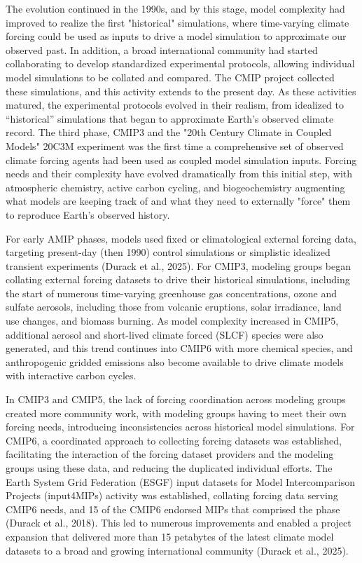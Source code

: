 \documentclass[gmd, preprint]{copernicus}
\begin{document}
The evolution continued in the 1990s, and by this stage, model complexity had improved to realize the first "historical" simulations, where time-varying climate forcing could be used as inputs to drive a model simulation to approximate our observed past. In addition, a broad international community had started collaborating to develop standardized experimental protocols, allowing individual model simulations to be collated and compared. The CMIP project collected these simulations, and this activity extends to the present day. As these activities matured, the experimental protocols evolved in their realism, from idealized to “historical” simulations that began to approximate Earth’s observed climate record. The third phase, CMIP3 and the "20th Century Climate in Coupled Models" 20C3M experiment was the first time a comprehensive set of observed climate forcing agents had been used as coupled model simulation inputs. Forcing needs and their complexity have evolved dramatically from this initial step, with atmospheric chemistry, active carbon cycling, and biogeochemistry augmenting what models are keeping track of and what they need to externally "force" them to reproduce Earth’s observed history.

For early AMIP phases, models used fixed or climatological external forcing data, targeting present-day (then 1990) control simulations or simplistic idealized transient experiments (Durack et al., 2025). For CMIP3, modeling groups began collating external forcing datasets to drive their historical simulations, including the start of numerous time-varying greenhouse gas concentrations, ozone and sulfate aerosols, including those from volcanic eruptions, solar irradiance, land use changes, and biomass burning. As model complexity increased in CMIP5, additional aerosol and short-lived climate forced (SLCF) species were also generated, and this trend continues into CMIP6 with more chemical species, and anthropogenic gridded emissions also become available to drive climate models with interactive carbon cycles.

In CMIP3 and CMIP5, the lack of forcing coordination across modeling groups created more community work, with modeling groups having to meet their own forcing needs, introducing inconsistencies across historical model simulations. For CMIP6, a coordinated approach to collecting forcing datasets was established, facilitating the interaction of the forcing dataset providers and the modeling groups using these data, and reducing the duplicated individual efforts. The Earth System Grid Federation (ESGF) input datasets for Model Intercomparison Projects (input4MIPs) activity was established, collating forcing data serving CMIP6 needs, and 15 of the CMIP6 endorsed MIPs that comprised the phase (Durack et al., 2018). This led to numerous improvements and enabled a project expansion that delivered more than 15 petabytes of the latest climate model datasets to a broad and growing international community (Durack et al., 2025).
\end{document}
